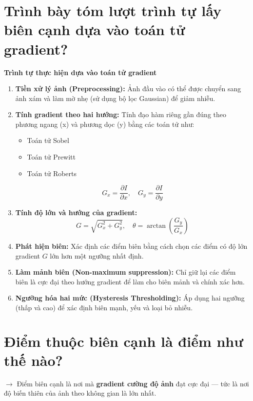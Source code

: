 \documentclass[12pt]{article}
\begin{document}
	\section{Trình bày tóm lượt trình tự lấy biên cạnh dựa vào toán tử gradient?}
	
	\textbf{Trình tự thực hiện dựa vào toán tử gradient}
	
	\begin{enumerate}[label=\textbf{Bước \arabic*:}]
	\item \textbf{Tiền xử lý ảnh (Preprocessing):}  
	Ảnh đầu vào có thể được chuyển sang ảnh xám và làm mờ nhẹ (sử dụng bộ lọc Gaussian) để giảm nhiễu.
	
	\item \textbf{Tính gradient theo hai hướng:}  
	Tính đạo hàm riêng gần đúng theo phương ngang (x) và phương dọc (y) bằng các toán tử như:
	\begin{itemize}
	\item Toán tử Sobel
	\item Toán tử Prewitt
	\item Toán tử Roberts
	\end{itemize}
	\[
	G_x = \frac{\partial I}{\partial x}, \quad G_y = \frac{\partial I}{\partial y}
	\]
	
	\item \textbf{Tính độ lớn và hướng của gradient:}  
	\[
	G = \sqrt{G_x^2 + G_y^2}, \quad \theta = \arctan\left(\frac{G_y}{G_x}\right)
	\]
	
	\item \textbf{Phát hiện biên:}  
	Xác định các điểm biên bằng cách chọn các điểm có độ lớn gradient $G$ lớn hơn một ngưỡng nhất định.
	
	\item \textbf{Làm mảnh biên (Non-maximum suppression):}  
	Chỉ giữ lại các điểm biên là cực đại theo hướng gradient để làm cho biên mảnh và chính xác hơn.
	
	\item \textbf{Ngưỡng hóa hai mức (Hysteresis Thresholding):}  
	Áp dụng hai ngưỡng (thấp và cao) để xác định biên mạnh, yếu và loại bỏ nhiễu.
	
	\end{enumerate}
	
	\section{Điểm thuộc biên cạnh là điểm như thế nào?}
	
	$\rightarrow$ Điểm biên cạnh là nơi mà \textbf{gradient cường độ ảnh} đạt cực đại — tức là nơi độ biến thiên của ảnh theo không gian là lớn nhất.
	
\end{document}
